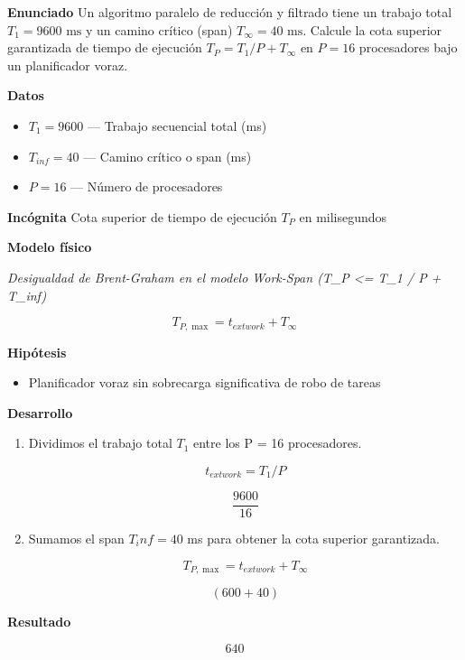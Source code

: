 \documentclass{book}
\begin{document}
\begin{tcolorbox}[title={Problema resuelto}, studiumworked, breakable]

\noindent\textbf{Enunciado}
Un algoritmo paralelo de reducción y filtrado tiene un trabajo total \(T_1 = 9600\text{ ms}\) y un camino crítico (span) \(T_\infty = 40\text{ ms}\). Calcule la cota superior garantizada de tiempo de ejecución \(T_P = T_1 / P + T_\infty\) en \(P = 16\) procesadores bajo un planificador voraz.

\noindent\textbf{Datos}
\begin{itemize}
\item $T_{1} = 9600$ — Trabajo secuencial total (ms)
\item $T_{inf} = 40$ — Camino crítico o span (ms)
\item $P = 16$ — Número de procesadores
\end{itemize}

\noindent\textbf{Incógnita}
Cota superior de tiempo de ejecución \(T_P\) en milisegundos

\noindent\textbf{Modelo físico}

\noindent\textit{Desigualdad de Brent-Graham en el modelo Work-Span (T\_P <= T\_1 / P + T\_inf)}

\[
T_{P,\max} = t_{	ext{work}} + T_{\infty}
\]

\noindent\textbf{Hipótesis}
\begin{itemize}
\item Planificador voraz sin sobrecarga significativa de robo de tareas
\end{itemize}

\noindent\textbf{Desarrollo}
\begin{enumerate}
\item
Dividimos el trabajo total \(T_1\) entre los P = 16 procesadores.

\[
t_{	ext{work}} = T_1 / P
\]

\[
\frac{9600}{16}
\]
\item
Sumamos el span \(T_inf = 40\) ms para obtener la cota superior garantizada.

\[
T_{P,\max} = t_{	ext{work}} + T_{\infty}
\]

\[
\left(600+40\right)
\]
\end{enumerate}

\noindent\textbf{Resultado}

\[
640
\]


\end{tcolorbox}
\end{document}
